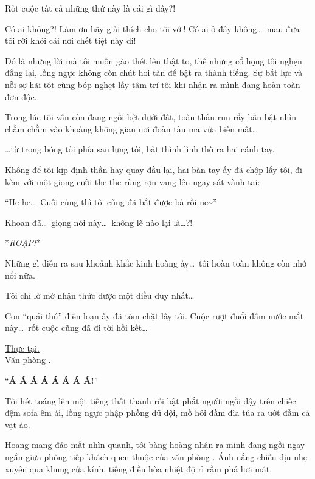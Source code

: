\documentclass[../main.tex]{subfiles}
\begin{document}
Rốt cuộc tất cả những thứ này là cái gì đây?!

Có ai không?! Làm ơn hãy giải thích cho tôi với! Có ai ở đây không\dots\ mau đưa tôi rời khỏi cái nơi chết tiệt này đi!

Đó là những lời mà tôi muốn gào thét lên thật to, thế nhưng cổ họng tôi nghẹn đắng lại, lồng ngực không còn chút hơi tàn để bật ra thành tiếng. Sự bất lực và nỗi sợ hãi tột cùng bóp nghẹt lấy tâm trí tôi khi nhận ra mình đang hoàn toàn đơn độc.

Trong lúc tôi vẫn còn đang ngồi bệt dưới đất, toàn thân run rẩy bần bật nhìn chằm chằm vào khoảng không gian nơi đoàn tàu ma vừa biến mất\dots

\dots từ trong bóng tối phía sau lưng tôi, bất thình lình thò ra hai cánh tay.


Không để tôi kịp định thần hay quay đầu lại, hai bàn tay ấy đã chộp lấy tôi, đi kèm với một giọng cười the the rùng rợn vang lên ngay sát vành tai:

``He he\dots\ Cuối cùng thì tôi cũng đã bắt được bà rồi ne\~{}''

Khoan đã\dots\ giọng nói này\dots\ không lẽ nào lại là\dots?!

*\textit{ROẠP!}*

Những gì diễn ra sau khoảnh khắc kinh hoàng ấy\dots\ tôi hoàn toàn không còn nhớ nổi nữa.

Tôi chỉ lờ mờ nhận thức được một điều duy nhất\dots

Con ``quái thú'' điên loạn ấy đã tóm chặt lấy tôi. Cuộc rượt đuổi đẫm nước mắt này\dots\ rốt cuộc cũng đã đi tới hồi kết\dots

\omk

\begin{center}
    \uline{Thực tại.\\
        Văn phòng \hll.}
\end{center}

``\textbf{Á Á Á Á Á Á Á Á!}''

Tôi hét toáng lên một tiếng thất thanh rồi bật phắt người ngồi dậy trên chiếc đệm sofa êm ái, lồng ngực phập phồng dữ dội, mồ hôi đầm đìa túa ra ướt đẫm cả vạt áo.


Hoang mang đảo mắt nhìn quanh, tôi bàng hoàng nhận ra mình đang ngồi ngay ngắn giữa phòng tiếp khách quen thuộc của văn phòng \hll. Ánh nắng chiều dịu nhẹ xuyên qua khung cửa kính, tiếng điều hòa nhiệt độ rì rầm phả hơi mát.
\end{document}

